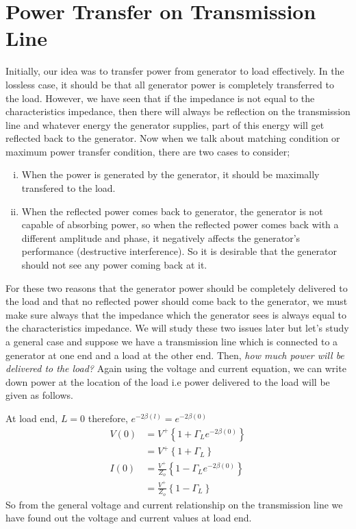 \section{Power Transfer on Transmission Line}
Initially, our idea was to transfer power from generator to load effectively. In the lossless case, it should be that all generator power is completely transferred to the load. However, we have seen that if the impedance is not equal to the characteristics impedance, then there will always be reflection on the transmission line and whatever energy the generator supplies, part of this energy will get reflected back to the generator. Now when we talk about matching condition or maximum power transfer condition, there are two cases to consider;
\begin{enumerate}[(i)]
\item When the power is generated by the generator, it should be maximally transfered to the load.
\item When the reflected power comes back to generator, the generator is not capable of absorbing power, so when the reflected power comes back with a different amplitude and phase, it negatively affects the generator's performance (destructive interference). So it is desirable that the generator should not see any power coming back at it.
\end{enumerate}
For these two reasons that the generator power should be completely delivered to the load and that no reflected power should come back to the generator, we must make sure always that the impedance which the generator sees is always equal to the characteristics impedance. We will study these two issues later but let's study a general case and suppose we have a transmission line which is connected to a generator at  one end and a load at the other end. Then, \emph{how much power will be delivered to the load?} Again using the voltage and current equation, we can write down power at the location of the load i.e power delivered to the load will be given as follows.

At load end, $L=0$ therefore, $e^{-2\beta (l)} = e^{-2\beta (0)}$
\begin{align*}
V(0) &= V^{+} \left\lbrace {1 + \Gamma_L e^{-2\beta(0)}}\right\rbrace\\ 
&= V^{+}\left\lbrace 1 +\Gamma_L \right\rbrace\\
I(0) &= \frac{V^{+}}{Z_o} \left\lbrace{1 - \Gamma_L e^{-2\beta(0)}}\right\rbrace\\ 
&= \frac{V^{+}}{Z_o}\left\lbrace1 -\Gamma_L \right\rbrace
\end{align*}
So from the general voltage and current relationship on the transmission line we have found  out the voltage and current values at load end.

